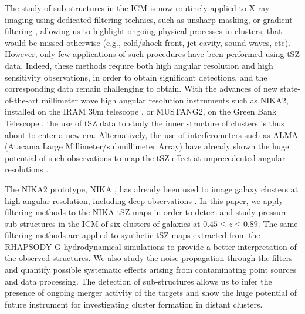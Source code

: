 \documentclass[twocolumn,traditabstract]{aa}
\begin{document}
The study of sub-structures in the ICM is now routinely applied to X-ray imaging using dedicated filtering technics, such as unsharp masking, or gradient filtering \citep[see, for example, recent results by][]{Sanders2016}, allowing us to highlight ongoing physical processes in clusters, that would be missed otherwise (e.g., cold/shock front, jet cavity, sound waves, etc). However, only few applications of such procedures have been performed using tSZ data. Indeed, these methods require both high angular resolution and high sensitivity observations, in order to obtain significant detections, and the corresponding data remain challenging to obtain. With the advances of new state-of-the-art millimeter wave high angular resolution instruments such as NIKA2, installed on the IRAM 30m telescope \citep[The New IRAM KIDs Array 2, $< 20$ arcsec resolution at 150 and 260 GHz,][]{Calvo2016,Catalano2016}, or MUSTANG2, on the Green Bank Telescope \citep[The MUltiplexed Squid Tes Array at Ninety Gigahertzh 2, $\sim 8$ arcsec at 90 GHz,][]{Dicker2014}, the use of tSZ data to study the inner structure of clusters is thus about to enter a new era. Alternatively, the use of interferometers such as ALMA (Atacama Large Millimeter/submillimeter Array) have already shown the huge potential of such observations to map the tSZ effect at unprecedented angular resolutions \citep{Kitayama2016}.

The NIKA2 prototype, NIKA \citep{Monfardini2011,Catalano2014}, has already been used to image galaxy clusters at high angular resolution, including deep observations \citep{Adam2014,Adam2015,Adam2016a,Adam2016b,Ruppin2016}. In this paper, we apply filtering methods to the NIKA tSZ maps in order to detect and study pressure sub-structures in the ICM of six clusters of galaxies at $0.45 \leq z \leq 0.89$. The same filtering methods are applied to synthetic tSZ maps extracted from the RHAPSODY-G hydrodynamical simulations \citep{Wu2013,Hahn2017} to provide a better interpretation of the observed structures. We also study the noise propagation through the filters and quantify possible systematic effects arising from contaminating point sources and data processing. The detection of sub-structures allows us to infer the presence of ongoing merger activity of the targets and show the huge potential of future instrument for investigating cluster formation in distant clusters.
\end{document}
